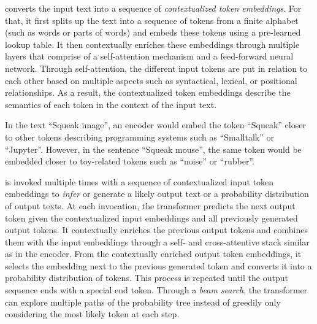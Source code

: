 \begin{description}[noextralabelsep]
	\item[The encoder] converts the input text into a sequence of \emph{contextualized token embeddings}.
	For that, it first splits up the text into a sequence of tokens from a finite alphabet (such as words or parts of words) and embeds these tokens using a pre-learned lookup table.
	It then contextually enriches these embeddings through multiple layers that comprise of a self-attention mechanism and a feed-forward neural network.
	Through self-attention, the different input tokens are put in relation to each other based on multiple aspects such as syntactical, lexical, or positional relationships.
	As a result, the contextualized token embeddings describe the semantics of each token in the context of the input text.

	\begin{example}
		In the text ``Squeak image'', an encoder would embed the token ``Squeak'' closer to other tokens describing programming systems such as ``Smalltalk'' or ``Jupyter''.
		However, in the sentence ``Squeak mouse'', the same token would be embedded closer to toy-related tokens such as ``noise'' or ``rubber''.
	\end{example}

	\item[The decoder] is invoked multiple times with a sequence of contextualized input token embeddings to \emph{infer} or generate a likely output text or a probability distribution of output texts.
	At each invocation, the transformer predicts the next output token given the contextualized input embeddings and all previously generated output tokens.
	It contextually enriches the previous output tokens and combines them with the input embeddings through a self- and cross-attentive stack similar as in the encoder.
	From the contextually enriched output token embeddings, it selects the embedding next to the previous generated token and converts it into a probability distribution of tokens.
	This process is repeated until the output sequence ends with a special end token.
	Through a \emph{beam search}, the transformer can explore multiple paths of the probability tree instead of greedily only considering the most likely token at each step.


\end{description}
